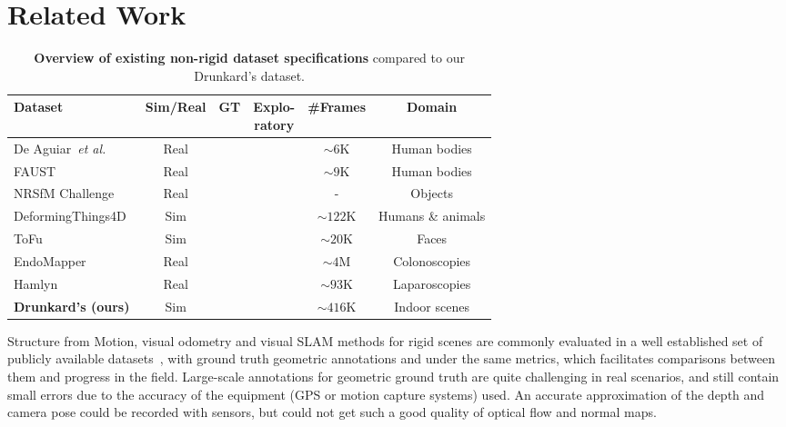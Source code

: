 \documentclass{article}
\def\etal{\emph{et al.}\xspace}
\newcommand{\cmark}{\textcolor{OliveGreen}{\ding{51}}}\newcommand{\xmark}{\textcolor{red}{\ding{55}}}
\begin{document}
\section{Related Work}  \label{sec:related}
\begin{wraptable}[12]{r}{8.1cm}
  \vspace{-12pt}
  \centering
  \scriptsize
  \setlength{\tabcolsep}{2pt}
  \renewcommand{\arraystretch}{1.15}
  \begin{tabular}{lccccc}
     \toprule
     Dataset & Sim/Real & GT & \makecell{Explo-\\ratory} & \#Frames & Domain \\ 
     \midrule
     De Aguiar~\etal~\cite{de2008performance} & Real & \cmark & \xmark & $\sim6$K & Human bodies   \\ 
     FAUST~\cite{bogo2014faust} & Real & \cmark & \xmark & $\sim9$K & Human bodies   \\ 
     NRSfM Challenge~\cite{jensen2021benchmark} & Real & \cmark & \xmark &- & Objects   \\ 
     DeformingThings4D~\cite{li20214dcomplete} & Sim & \cmark & \xmark & $\sim122$K & Humans \& animals \\
     ToFu~\cite{li2021topologically} & Sim & \cmark &\xmark& $\sim20$K & Faces \\ EndoMapper~\cite{azagra2022endomapper} & Real & \xmark &\cmark& $\sim4$M & Colonoscopies \\
     Hamlyn~\cite{mountney2010three,stoyanov2005soft,stoyanov2010real,pratt2010dynamic} & Real & \xmark &\cmark& $\sim93$K & Laparoscopies \\
     \textbf{Drunkard's (ours)} & Sim & \cmark &\cmark& $\sim416$K & Indoor scenes \\ 
     \bottomrule     
  \end{tabular}
  \vspace{-4pt}
  \caption{\textbf{Overview of existing non-rigid dataset specifications} compared to our Drunkard's dataset.}
  \label{tab:related}
\end{wraptable}
Structure from Motion, visual odometry and visual SLAM methods for rigid scenes are commonly evaluated in a well established set of publicly available datasets~\cite{sturm2012benchmark,geiger2013vision,wilson2014robust,burri2016euroc,dai2017scannet,schubert2018tum,schops2019bad}, with ground truth geometric annotations and under the same metrics, which facilitates comparisons between them and progress in the field. Large-scale annotations for geometric ground truth are quite challenging in real scenarios, and still contain small errors due to the accuracy of the equipment (GPS or motion capture systems) used. An accurate approximation of the depth and camera pose could be recorded with sensors, but could not get such a good quality of optical flow and normal maps.
\end{document}

